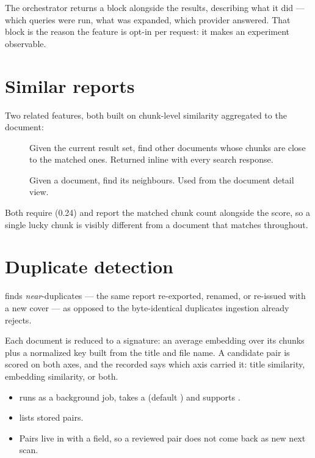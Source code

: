 The orchestrator returns a  block alongside the results,
describing what it did --- which queries were run, what was expanded, which
provider answered. That block is the reason the feature is opt-in per request:
it makes an experiment observable.

\section{Similar reports}

Two related features, both built on chunk-level similarity aggregated to the
document:

\begin{description}
\item[] Given the current result set,
find other documents whose chunks are close to the matched ones. Returned inline
with every search response.
\item[] Given a document, find its
neighbours. Used from the document detail view.
\end{description}

Both require  (0.24) and report the matched
chunk count alongside the score, so a single lucky chunk is visibly different
from a document that matches throughout.

\section{Duplicate detection}
\label{sec:duplicate-detection}

 finds \emph{near}-duplicates --- the same report
re-exported, renamed, or re-issued with a new cover --- as opposed to the
byte-identical duplicates ingestion already rejects.

Each document is reduced to a signature: an average embedding over its chunks
plus a normalized key built from the title and file name. A candidate pair is
scored on both axes, and the recorded  says which axis carried it:
title similarity, embedding similarity, or both.

\begin{itemize}
\item {} runs as a background job, takes a
 (default ) and supports .
\item {} lists stored pairs.
\item Pairs live in  with a  field,
so a reviewed pair does not come back as new next scan.
\end{itemize}

